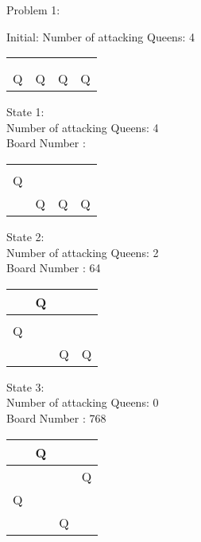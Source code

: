 \documentclass[a4paper,10pt]{article}
\begin{document}
Problem 1:\\
\begin{flushleft}
Initial: Number of attacking Queens: 4 \\
\vspace{5mm}
    \begin{tabular}{| l | l | l | l |}
    \hline
     & & & \\ \hline
     & & & \\ \hline
     & & & \\ \hline
    Q & Q & Q & Q \\ \hline
    \end{tabular}
\break
\break
\begin{flushleft}
State 1:\\
Number of attacking Queens: 4 \\
Board Number :  \\
\vspace{5mm}
    \begin{tabular}{| l | l | l | l |}
    \hline
     & & & \\ \hline
     & & & \\ \hline
     Q & & & \\ \hline
     & Q & Q & Q \\ \hline
    \end{tabular}
\break
\break
\begin{flushleft}
State 2:\\
Number of attacking Queens: 2\\
Board Number : 64\\
\vspace{5mm}
    \begin{tabular}{| l | l | l | l |}
    \hline
     & Q & & \\ \hline
     & & & \\ \hline
     Q & & & \\ \hline
     & & Q & Q \\ \hline
    \end{tabular}
\break
\break

\begin{flushleft}
State 3:\\
Number of attacking Queens: 0\\
Board Number :  768\\
\vspace{5mm}
    \begin{tabular}{| l | l | l | l |}
    \hline
     & Q & & \\ \hline
     & & & Q \\ \hline
     Q & & & \\ \hline
     & & Q & \\ \hline
    \end{tabular}
\break


\end{flushleft}
\end{flushleft}
\end{flushleft}
\end{flushleft}
\end{document}
